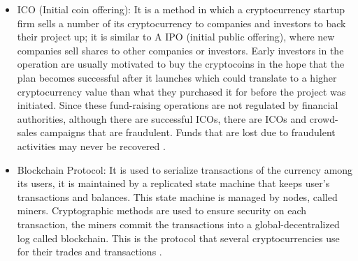 \begin{itemize}
\item ICO (Initial coin offering): It is a method in which a cryptocurrency startup firm sells a number of its cryptocurrency to companies and investors to back their project up; it is similar to A IPO (initial public offering), where new companies sell shares to other companies or investors. Early investors in the operation are usually motivated to buy the cryptocoins in the hope that the plan becomes successful after it launches which could translate to a higher cryptocurrency value than what they purchased it for before the project was initiated. Since these fund-raising operations are not regulated by financial authorities, although there are successful ICOs, there are ICOs and crowd-sales campaigns that are fraudulent. Funds that are lost due to fraudulent activities may never be recovered \cite{ICO}.
\item Blockchain Protocol: It is used to serialize transactions of the currency among its users, it is maintained by a replicated state machine that keeps user's transactions and balances. This state machine is managed by nodes, called miners. Cryptographic methods are used to ensure security on each transaction, the miners commit the transactions into a global-decentralized log called blockchain. This is the protocol that several cryptocurrencies use for their trades and transactions \cite{blockchain}.
\end{itemize}

